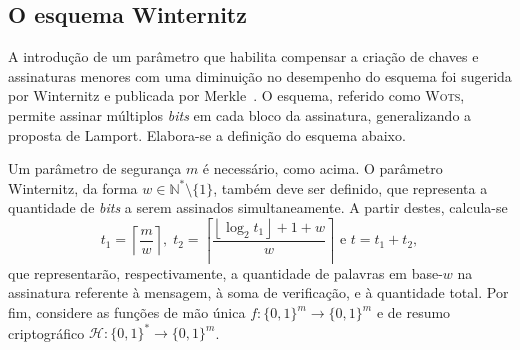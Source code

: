 \documentclass[12pt]{report}
\newcommand{\hh}{\mathcal{H}}
\newcommand{\binwds}[1]{\{0, 1\}^{#1}}
\newcommand{\fhash}[1]{\hh{} : \binwds{*} \longrightarrow \binwds{#1}}
\begin{document}
\subsection{O esquema Winternitz}

A introdução de um parâmetro que habilita compensar a criação de chaves e
assinaturas menores com uma diminuição no desempenho do esquema foi sugerida
por Winternitz e publicada por Merkle~\cite{Merkle:1989:CDS:118209.118230}.  O
esquema, referido como \textsc{Wots}, permite assinar múltiplos \emph{bits} em
cada bloco da assinatura, generalizando a proposta de Lamport. Elabora-se a
definição do esquema abaixo.

Um parâmetro de segurança $m$ é necessário, como acima. O parâmetro Winternitz,
da forma $w \in \mathbb{N}^{*}\setminus\{1\}$, também deve ser definido, que representa a
quantidade de \emph{bits} a serem assinados simultaneamente.  A partir destes,
calcula-se $$t_1 = \left\lceil \frac{m}{w} \right\rceil, \; t_2 = \left\lceil
\frac{\left\lfloor \log_2 t_1 \right\rfloor + 1 + w}{w} \right\rceil \text{ e }
t = t_1 + t_2,$$ que representarão, respectivamente, a quantidade de palavras
em base-$w$ na assinatura referente à mensagem, à soma de verificação, e à
quantidade total.  Por fim, considere as funções de mão única $f : \binwds{m}
\longrightarrow \binwds{m}$ e de resumo criptográfico $\fhash{m}$.
\end{document}
